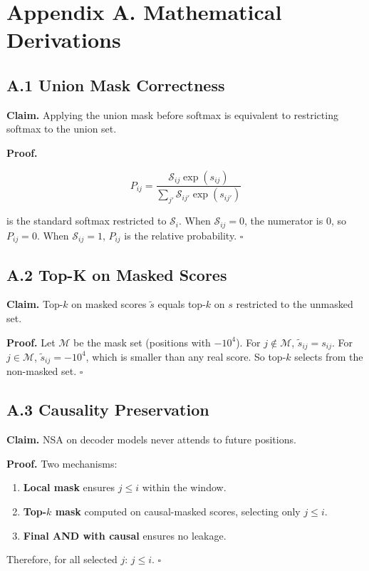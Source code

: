 
\section{Appendix A. Mathematical Derivations}

\subsection{A.1 Union Mask Correctness}

\textbf{Claim.} Applying the union mask before softmax is equivalent to 
restricting softmax to the union set.

\textbf{Proof.} 

\[
P_{ij} = \frac{\mathcal{S}_{ij} \exp(s_{ij})}{\sum_{j'} \mathcal{S}_{ij'} \exp(s_{ij'})}
\tag{A.1}
\]

is the standard softmax restricted to $\mathcal{S}_i$. When $\mathcal{S}_{ij} = 0$, the numerator is 0, so $P_{ij} = 0$. When $\mathcal{S}_{ij} = 1$, $P_{ij}$ is the relative probability. $\square$

\subsection{A.2 Top-K on Masked Scores}

\textbf{Claim.} Top-$k$ on masked scores $\tilde{s}$ equals top-$k$ on $s$ restricted 
to the unmasked set.

\textbf{Proof.} Let $\mathcal{M}$ be the mask set (positions with $-10^4$). For 
$j \notin \mathcal{M}$, $\tilde{s}_{ij} = s_{ij}$. For $j \in \mathcal{M}$, 
$\tilde{s}_{ij} = -10^4$, which is smaller than any real score. So top-$k$ 
selects from the non-masked set. $\square$

\subsection{A.3 Causality Preservation}

\textbf{Claim.} NSA on decoder models never attends to future positions.

\textbf{Proof.} Two mechanisms:

\begin{enumerate}
\item \textbf{Local mask} ensures $j \leq i$ within the window.
\item \textbf{Top-$k$ mask} computed on causal-masked scores, selecting only
  $j \leq i$.
\item \textbf{Final AND with causal} ensures no leakage.

\end{enumerate}
Therefore, for all selected $j$: $j \leq i$. $\square$

